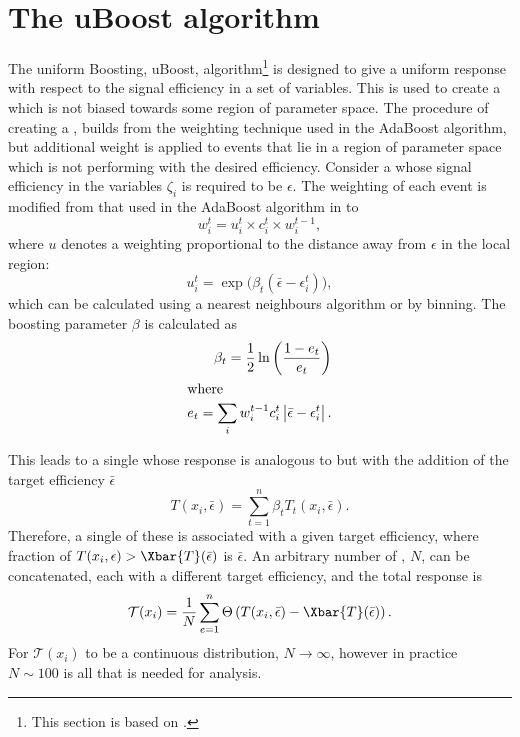 \section{The uBoost algorithm}
\label{sec:bdt:uboost}
The uniform Boosting, uBoost, algorithm\footnote{
  This section is based on .} is designed to give a uniform
response
with respect to the signal efficiency in a set of variables.
This is used to create a \BDT which is not biased towards some region of parameter space.
The procedure of creating a \uBDT, builds from the weighting technique used in the
AdaBoost algorithm, but additional weight is applied to events that lie in a region of parameter
space which is not performing with the desired efficiency.
Consider a \BDT whose signal efficiency in the variables $\zeta_i$ is required to be $\epsilon$.
The weighting of each event is modified from that used in the AdaBoost algorithm in 
to
\begin{equation}
  w_i^t = u_i^t\times c_i^t \times w_i^{t-1},
\end{equation}
where $u$ denotes a weighting proportional to the distance away from $\epsilon$ in the local
region:
\begin{equation}
  u_i^t = \exp\big(\beta_t(\bar\epsilon-\epsilon_i^t)\big),
\end{equation}
which can be calculated using a nearest neighbours algorithm or by binning.
The boosting parameter $\beta$ is calculated as
\begin{align}
  \beta_t = \frac12\ln\left(\frac{1-e_t}{e_t}\right) \\
  \intertext{where}
  e_t = \sum_i w_i^{t-1}c_i^t\left|\bar\epsilon-\epsilon_i^t\right|.
\end{align}

This leads to a single \BDT whose response is analogous to  but with the addition
of the target efficiency $\bar\epsilon$
\begin{equation}
  T(x_i,\bar\epsilon) = \sum_{t=1}^{n} \beta_tT_t(x_i,\bar\epsilon).
  \label{eq:ada:fullbdt}
\end{equation}
Therefore, a single of these \BDTs is associated with a given target efficiency, where
fraction of $T(x_i,\epsilon)>\Xbar{T}(\bar\epsilon)$ is $\bar\epsilon$.
An arbitrary number of \BDTs, $N$, can be concatenated, each with a different target efficiency, and
the total response is
\begin{equation}
  \mathcal{T}(x_i) =
  \frac1N\sum_{e=1}^{n}\Theta\left(T(x_i, \bar\epsilon) - \Xbar{T}(\bar\epsilon)\right).
\end{equation}
For $\mathcal{T}(x_i)$ to be a continuous distribution, $N\!\to\infty$, however in practice
$N\sim100$ is all that is needed for analysis.

